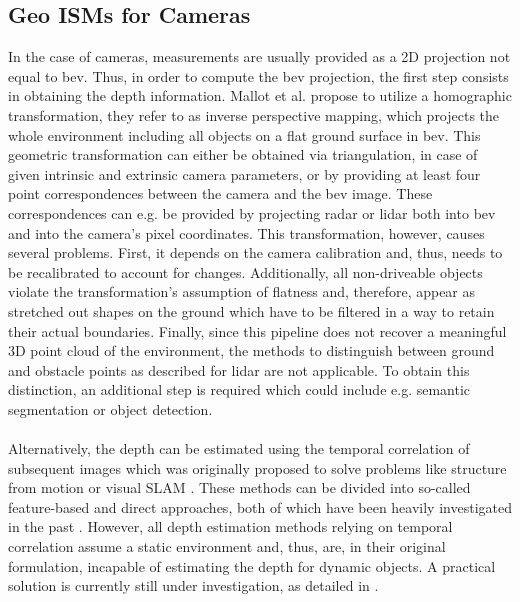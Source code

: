 \subsection{Geo ISMs for Cameras}
\label{subsec:geo_ism_camera}
In the case of cameras, measurements are usually provided as a 2D projection not equal to \gls{bev}. Thus, in order to compute the \gls{bev} projection, the first step consists in obtaining the depth information. Mallot et al. \cite{mallot1991inverse} propose to utilize a homographic transformation, they refer to as inverse perspective mapping, which projects the whole environment including all objects on a flat ground surface in \gls{bev}. This geometric transformation can either be obtained via triangulation, in case of given intrinsic and extrinsic camera parameters, or by providing at least four point correspondences between the camera and the \gls{bev} image. These correspondences can e.g. be provided by projecting radar or lidar both into \gls{bev} and into the camera's pixel coordinates. This transformation, however, causes several problems. First, it depends on the camera calibration and, thus, needs to be recalibrated to account for changes. Additionally, all non-driveable objects violate the transformation's assumption of flatness and, therefore, appear as stretched out shapes on the ground which have to be filtered in a way to retain their actual boundaries. Finally, since this pipeline does not recover a meaningful 3D point cloud of the environment, the methods to distinguish between ground and obstacle points as described for lidar are not applicable. To obtain this distinction, an additional step is required which could include e.g. semantic segmentation or object detection.
\\\\
Alternatively, the depth can be estimated using the temporal correlation of subsequent images which was originally proposed to solve problems like structure from motion \cite{longuet1981computer} or visual SLAM \cite{davison2007monoslam}. These methods can be divided into so-called feature-based and direct approaches, both of which have been heavily investigated in the past \cite{ma2020image}. However, all depth estimation methods relying on temporal correlation assume a static environment and, thus, are, in their original formulation, incapable of estimating the depth for dynamic objects. A practical solution is currently still under investigation, as detailed in \cite{saputra2018visual}.
\\\\

